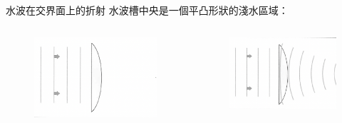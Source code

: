 \documentclass[13pt]{beamer}
\begin{document}
\begin{frame}{水波在交界面上的折射}
    水波槽中央是一個平凸形狀的淺水區域：
    \begin{columns}
        \begin{figure}
            \centering
            \includegraphics[width=1\linewidth]{images/Screenshot 2023-09-27 at 8.31.00 PM.png}


        \end{figure}
        \begin{figure}
            \centering
            \includegraphics[width=1\linewidth]{images/Screenshot 2023-09-27 at 8.31.30 PM.png}


        \end{figure}
    \end{columns}
\end{frame}
\end{document}
